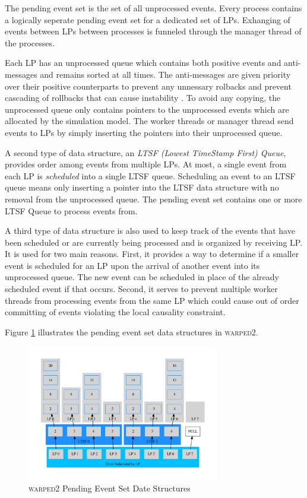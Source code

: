 \documentclass[11pt]{book}
\begin{document}
The pending event set is the set of all unprocessed events. Every process contains a
logically seperate pending event set for a dedicated set of LPs. Exhanging of events
between LPs between processes is funneled through the manager thread of the processes.

Each LP has an unprocessed queue which contains both positive events and anti-messages and
remains sorted at all times. The anti-messages are given priority over their positive counterparts
to prevent any unnessary rolbacks and prevent cascading of rollbacks that can cause instability
\cite{lubachevsky-89}. To avoid any copying, the unprocessed queue only contains pointers
to the unprocessed events which are allocated by the simulation model. The worker threads
or manager thread send events to LPs by simply inserting the pointers into their unprocessed
queue.

A second type of data structure, an \emph{LTSF (Lowest TimeStamp First) Queue}, provides
order among events from multiple LPs. At most, a single event from each LP is \emph{scheduled}
into a single LTSF queue. Scheduling an event to an LTSF queue means only inserting a pointer
into the LTSF data structure with no removal from the unprocessed queue. The pending event
set contains one or more LTSF Queue to process events from.

A third type of data structure is also used to keep track of the events that have been
scheduled or are currently being processed and is organized by receiving LP. It is used for
two main reasons. First, it provides a way to determine if a smaller event is scheduled for
an LP upon the arrival of another event into its unprocessed queue. The new event can be
scheduled in place of the already scheduled event if that occurs. Second, it serves to
prevent multiple worker threads from processing events from the same LP which could cause
out of order committing of events violating the local causality constraint\cite{fujimoto-90}.

Figure \ref{pending_event_set} illustrates the pending event set data structures in
\textsc{warped2}.

\begin{figure}[H]
    \centering
    \includegraphics[width=0.75\textwidth]{figs/graphviz/pending_event_set.pdf}
    \caption{\textsc{warped2} Pending Event Set Date Structures}\label{pending_event_set}
\end{figure}
\end{document}
